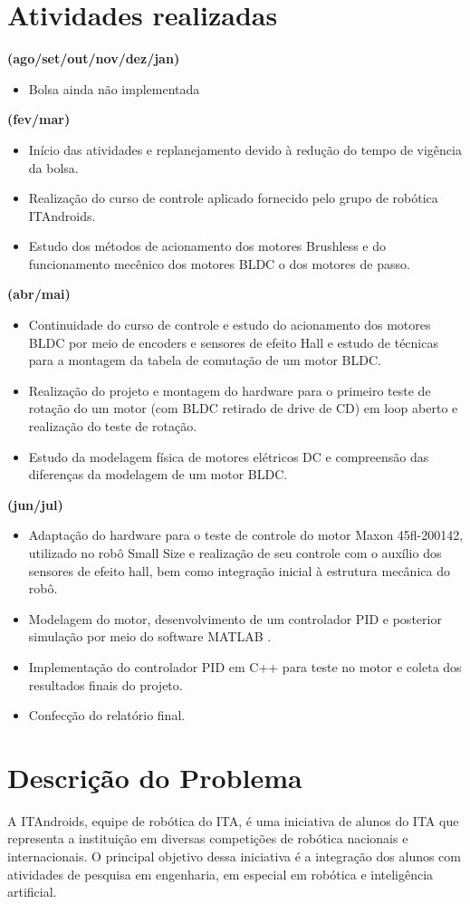 \documentclass[a4paper,11pt]{article}
\begin{document}
	\section{Atividades realizadas}
	\textbf{(ago/set/out/nov/dez/jan)}
	\begin{itemize}
		\item Bolsa ainda não implementada
	\end{itemize}
	\textbf{(fev/mar)}
	\begin{itemize}
		\item Início das atividades e replanejamento devido à redução do tempo de vigência da bolsa.
		\item Realização do curso de controle aplicado fornecido pelo grupo de robótica ITAndroids.
		\item Estudo dos métodos de acionamento dos motores Brushless e do funcionamento mecênico dos motores BLDC o dos motores de passo.
	\end{itemize}
		\textbf{(abr/mai)}
	\begin{itemize}
		\item Continuidade do curso de controle e estudo do acionamento dos motores BLDC por meio de encoders e sensores de efeito Hall e estudo de técnicas para a montagem da tabela de comutação de um motor BLDC.
		\item Realização do projeto e montagem do hardware para o primeiro teste de rotação do um motor (com BLDC retirado de drive de CD) em loop aberto e realização do teste de rotação.
		\item Estudo da modelagem física de motores elétricos DC e compreensão das diferenças da modelagem de um motor BLDC.
	\end{itemize}
		\textbf{(jun/jul)}
		\begin{itemize}
			\item Adaptação do hardware para o teste de controle do motor Maxon 45fl-200142, utilizado no robô Small Size e realização de seu controle com o auxílio dos sensores de efeito hall, bem como integração inicial à estrutura mecânica do robô.
			\item Modelagem do motor, desenvolvimento de um controlador PID e posterior simulação por meio do software MATLAB \cite{MATLAB}.
			\item Implementação do controlador PID em C++ para teste no motor e coleta dos resultados finais do projeto.
			\item Confecção do relatório final.
		\end{itemize}
	\section{Descrição do Problema}
		A ITAndroids, equipe de robótica do ITA, é uma iniciativa de alunos do ITA que representa a instituição em diversas competições de robótica nacionais e internacionais. O principal objetivo dessa iniciativa é a integração dos alunos com atividades de pesquisa em engenharia, em especial em robótica e inteligência artificial.
		
\end{document}
